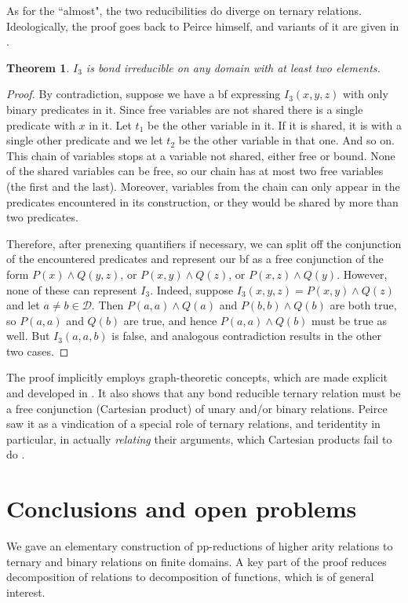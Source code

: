 \documentclass[11pt]{article}
\theoremstyle{plain}
\newtheorem{theorem}{Theorem}
\theoremstyle{definition}
\def\D{\mathcal{D}}
\begin{document}
As for the ``almost", the two reducibilities do diverge on ternary relations. Ideologically, the proof goes back to Peirce himself, and variants of it are given in \cite{Bur91,HerPos04,Herz,Kosh22}.
\begin{theorem}\label{I3Irr} 
$I_3$ is bond irreducible on any domain with at least two elements.
\end{theorem}
\begin{proof} By contradiction, suppose we have a bf expressing $I_3(x,y,z)$ with only binary predicates in it. Since free variables are not shared there is a single predicate with $x$ in it. Let $t_1$ be the other variable in it. If it is shared, it is with a single other predicate and we let $t_2$ be the other variable in that one. And so on. This chain of variables stops at a variable not shared, either free or bound. None of the shared variables can be free, so our chain has at most two free variables (the first and the last). Moreover, variables from the chain can only appear in the predicates encountered in its construction, or they would be shared by more than two predicates.

Therefore, after prenexing quantifiers if necessary, we can split off the conjunction of the encountered predicates and represent our bf as a free conjunction of the form $P(x)\land Q(y,z)$, or $P(x,y)\land Q(z)$, or $P(x,z)\land Q(y)$. However, none of these can represent $I_3$. Indeed, suppose $I_3(x,y,z)=P(x,y)\land Q(z)$ and let $a\neq b\in\D$. Then $P(a,a)\land Q(a)$ and $P(b,b)\land Q(b)$ are both true, so $P(a,a)$ and $Q(b)$ are true, and hence $P(a,a)\land Q(b)$ must be true as well. But $I_3(a,a,b)$ is false, and analogous contradiction results in the other two cases.
\end{proof}
\noindent The proof implicitly employs graph-theoretic concepts, which are made explicit and developed in \cite{HerPos04,Kosh23}. It also shows that any bond reducible ternary relation must be a free conjunction (Cartesian product) of unary and/or binary relations. Peirce saw it as a vindication of a special role of ternary relations, and teridentity in particular, in actually {\it relating} their arguments, which Cartesian products fail to do \cite{Brun91,Kosh22}.

\section{Conclusions and open problems}\label{Conc}

We gave an elementary construction  of pp-reductions of higher arity relations to ternary and binary relations on finite domains. A key part of the proof reduces decomposition of relations to decomposition of functions, which is of general interest.
\end{document}
